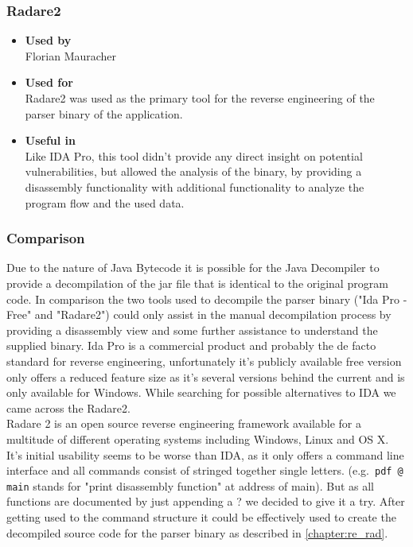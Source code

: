 \subsubsection*{Radare2}
\begin{itemize}
	\item \textbf{Used by}\\ Florian Mauracher
	\item \textbf{Used for}\\ Radare2 was used as the primary tool for the reverse engineering of the parser binary of the \bs{} application.
	\item \textbf{Useful in}\\ Like IDA Pro, this tool didn't provide any
		direct insight on potential vulnerabilities, but allowed the analysis
		of the binary, by providing a disassembly functionality with additional
		functionality to analyze the program flow and the used data.
\end{itemize}

\subsubsection*{Comparison}
Due to the nature of Java Bytecode it is possible for the Java Decompiler to
provide a decompilation of the jar file that is identical to the original
program code.
In comparison the two tools used to decompile the parser binary ("Ida Pro -
Free" and "Radare2") could only assist in the manual decompilation process by
providing a disassembly view and some further assistance to understand the
supplied binary. \newline
Ida Pro is a commercial product and probably the de facto standard for reverse
engineering, unfortunately it's publicly available free version only offers a
reduced feature size as it's several versions behind the current and is only
available for Windows.
While searching for possible alternatives to IDA we came across the Radare2. \\
Radare 2 is an open source reverse engineering framework available for a
multitude of different operating systems including Windows, Linux and OS X.
It's initial usability seems to be worse than IDA, as it only offers a command
line interface and all commands consist of stringed together single letters.
(e.g.\ \texttt{pdf @ main} stands for "print disassembly function" at address
of main). But as all functions are documented by just appending a ? we decided
to give it a try.
After getting used to the command structure it could be effectively used to
create the decompiled source code for the parser binary as described in
\autoref{chapter:re_rad}.


